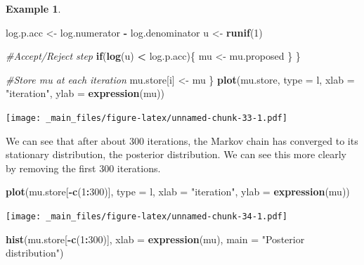 \documentclass[
]{book}
\newenvironment{Shaded}{\begin{snugshade}}{\end{snugshade}}
\newcommand{\AttributeTok}[1]{\textcolor[rgb]{0.13,0.29,0.53}{#1}}
\newcommand{\CommentTok}[1]{\textcolor[rgb]{0.56,0.35,0.01}{\textit{#1}}}
\newcommand{\ControlFlowTok}[1]{\textcolor[rgb]{0.13,0.29,0.53}{\textbf{#1}}}
\newcommand{\DecValTok}[1]{\textcolor[rgb]{0.00,0.00,0.81}{#1}}
\newcommand{\FunctionTok}[1]{\textcolor[rgb]{0.13,0.29,0.53}{\textbf{#1}}}
\newcommand{\NormalTok}[1]{#1}
\newcommand{\OtherTok}[1]{\textcolor[rgb]{0.56,0.35,0.01}{#1}}
\newcommand{\SpecialCharTok}[1]{\textcolor[rgb]{0.81,0.36,0.00}{\textbf{#1}}}
\newcommand{\StringTok}[1]{\textcolor[rgb]{0.31,0.60,0.02}{#1}}
\theoremstyle{definition}
\theoremstyle{definition}
\newtheorem{example}{Example}[chapter]
\theoremstyle{definition}
\theoremstyle{definition}
\theoremstyle{remark}
\begin{document}
\begin{example}
\begin{Shaded}
\begin{Highlighting}[]
\NormalTok{    log.p.acc }\OtherTok{\textless{}{-}}\NormalTok{ log.numerator }\SpecialCharTok{{-}}\NormalTok{ log.denominator}
\NormalTok{    u }\OtherTok{\textless{}{-}} \FunctionTok{runif}\NormalTok{(}\DecValTok{1}\NormalTok{)}
    
    \CommentTok{\#Accept/Reject step}
    \ControlFlowTok{if}\NormalTok{(}\FunctionTok{log}\NormalTok{(u) }\SpecialCharTok{\textless{}}\NormalTok{ log.p.acc)\{}
\NormalTok{      mu }\OtherTok{\textless{}{-}}\NormalTok{ mu.proposed}
\NormalTok{    \}}
\NormalTok{  \}}
  
  \CommentTok{\#Store mu at each iteration}
\NormalTok{  mu.store[i] }\OtherTok{\textless{}{-}}\NormalTok{ mu}
\NormalTok{\}}
\FunctionTok{plot}\NormalTok{(mu.store, }\AttributeTok{type =} \StringTok{\textquotesingle{}l\textquotesingle{}}\NormalTok{, }\AttributeTok{xlab =} \StringTok{"iteration"}\NormalTok{, }
     \AttributeTok{ylab =} \FunctionTok{expression}\NormalTok{(mu))}
\end{Highlighting}
\end{Shaded}

\texttt{[image: \_main\_files/figure-latex/unnamed-chunk-33-1.pdf]}

We can see that after about 300 iterations, the Markov chain has converged to its stationary distribution, the posterior distribution. We can see this more clearly by removing the first 300 iterations.

\begin{Shaded}
\begin{Highlighting}[]
\FunctionTok{plot}\NormalTok{(mu.store[}\SpecialCharTok{{-}}\FunctionTok{c}\NormalTok{(}\DecValTok{1}\SpecialCharTok{:}\DecValTok{300}\NormalTok{)], }\AttributeTok{type =} \StringTok{\textquotesingle{}l\textquotesingle{}}\NormalTok{, }\AttributeTok{xlab =} \StringTok{"iteration"}\NormalTok{, }\AttributeTok{ylab =} \FunctionTok{expression}\NormalTok{(mu))}
\end{Highlighting}
\end{Shaded}

\texttt{[image: \_main\_files/figure-latex/unnamed-chunk-34-1.pdf]}

\begin{Shaded}
\begin{Highlighting}[]
\FunctionTok{hist}\NormalTok{(mu.store[}\SpecialCharTok{{-}}\FunctionTok{c}\NormalTok{(}\DecValTok{1}\SpecialCharTok{:}\DecValTok{300}\NormalTok{)], }\AttributeTok{xlab =} \FunctionTok{expression}\NormalTok{(mu), }\AttributeTok{main =} \StringTok{"Posterior distribution"}\NormalTok{)}
\end{Highlighting}
\end{Shaded}


\end{example}
\end{document}

